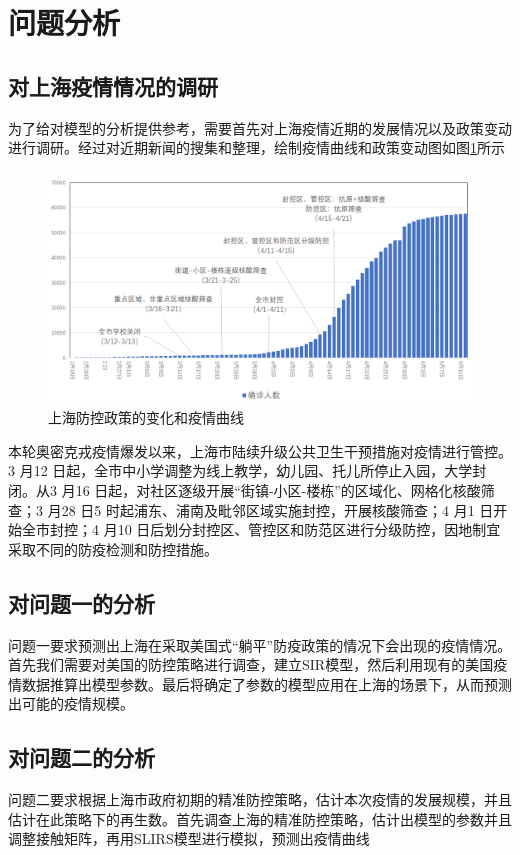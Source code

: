 \documentclass[bwprint]{gmcmthesis}
\numberwithin{figure}{section}
\begin{document}
\section{问题分析}
\subsection{对上海疫情情况的调研}
为了给对模型的分析提供参考，需要首先对上海疫情近期的发展情况以及政策变动进行调研。经过对近期新闻的搜集和整理，绘制疫情曲线和政策变动图如图\ref{sh}所示
\begin{figure}[!h]
\centering
\includegraphics[width=.9\textwidth]{shanghai_bianhua.png}
\caption{上海防控政策的变化和疫情曲线}
\label{sh}
\end{figure}
\par 本轮奥密克戎疫情爆发以来，上海市陆续升级公共卫生干预措施对疫情进行管控。3 月12 日起，全市中小学调整为线上教学，幼儿园、托儿所停止入园，大学封闭。从3 月16 日起，对社区逐级开展“街镇-小区-楼栋”的区域化、网格化核酸筛查；3 月28 日5 时起浦东、浦南及毗邻区域实施封控，开展核酸筛查；4 月1 日开始全市封控；4 月10 日后划分封控区、管控区和防范区进行分级防控，因地制宜采取不同的防疫检测和防控措施。
\subsection{对问题一的分析}
问题一要求预测出上海在采取美国式“躺平”防疫政策的情况下会出现的疫情情况。首先我们需要对美国的防控策略进行调查，建立SIR模型，然后利用现有的美国疫情数据推算出模型参数。最后将确定了参数的模型应用在上海的场景下，从而预测出可能的疫情规模。
\subsection{对问题二的分析}
问题二要求根据上海市政府初期的精准防控策略，估计本次疫情的发展规模，并且估计在此策略下的再生数。首先调查上海的精准防控策略，估计出模型的参数并且调整接触矩阵，再用SLIRS模型进行模拟，预测出疫情曲线
\end{document}
